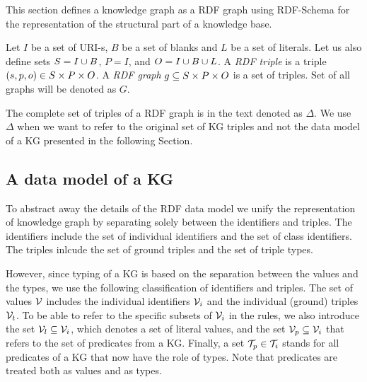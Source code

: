 \documentclass[runningheads]{llncs}
\newcommand{\I}{{\cal I}}
\newcommand{\V}{{\cal V}}
\newcommand{\T}{{\cal T}}
\begin{document}
This section defines a knowledge graph as a RDF graph \cite{rdf} using
RDF-Schema \cite{rdfschema} for the representation of the structural
part of a knowledge base. 

Let $I$ be a set of URI-s, $B$ be a set of blanks and $L$ be a set of
literals. Let us also define sets $S = I\cup\/B$, $P = I$, and
$O = I\cup\/B\cup\/L$. A \emph{RDF triple} is a triple
$(s,p,o)\in\/S\times\/P\times\/O$. A \emph{RDF graph}
$g\subseteq\/S\times\/P\times\/O$ is a set of triples. Set of all
graphs will be denoted as $G$.

The complete set of triples of a RDF graph is in the text denoted as
$\Delta$. We use $\Delta$ when we want to refer to the original set of
KG triples and not the data model of a KG presented in the following
Section.






\subsection{A data model of a KG}

To abstract away the details of the RDF data model we unify the
representation of knowledge graph by separating solely between the
identifiers and triples. The identifiers include the set of individual
identifiers and the set of class identifiers. The triples inlcude the
set of ground triples and the set of triple types.


However, since typing of a KG is based on the separation between the
values and the types, we use the following classification of
identifiers and triples. The set of values $\V$ includes the
individual identifiers $\V_i$ and the individual (ground) triples
$\V_t$. To be able to refer to the specific subsets of $\V_i$ in the
rules, we also introduce the set $\V_l\subseteq\V_i$, which denotes a
set of literal values, and the set $\V_p\subseteq\V_i$ that refers to
the set of predicates from a KG. Finally, a set $\T_p\in\T_i$ stands
for all predicates of a KG that now have the role of types. Note that
predicates are treated both as values and as types.
\end{document}
